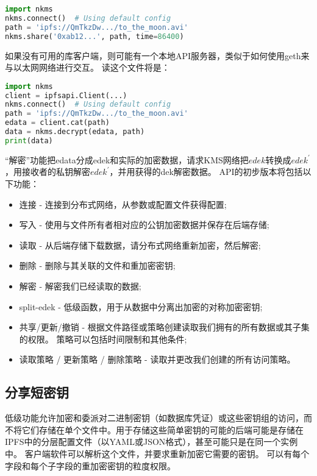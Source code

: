 \documentclass[longbibliography,nofootinbib]{revtex4-1}
\begin{document}
\begin{CJK*}{UTF8}{gbsn}
\begin{lstlisting}[frame=single,language=Python]
import nkms
nkms.connect()  # Using default config
path = 'ipfs://QmTkzDw.../to_the_moon.avi'
nkms.share('0xab12...', path, time=86400)
\end{lstlisting}

如果没有可用的库客户端，则可能有一个本地API服务器，类似于如何使用geth来与以太网网络进行交互。 读这个文件将是：

\begin{lstlisting}[frame=single,language=Python]
import nkms
client = ipfsapi.Client(...)
nkms.connect()  # Using default config
path = 'ipfs://QmTkzDw.../to_the_moon.avi'
edata = client.cat(path)
data = nkms.decrypt(edata, path)
print(data)
\end{lstlisting}

“解密”功能把edata分成edek和实际的加密数据，请求KMS网络把$edek$转换成$edek^{\prime}$，用接收者的私钥解密$edek^{\prime}$，并用获得的dek解密数据。
  API的初步版本将包括以下功能：

\begin{itemize}
    \item 连接 - 连接到分布式网络，从参数或配置文件获得配置;
    \item 写入 - 使用与文件所有者相对应的公钥加密数据并保存在后端存储;
    \item 读取 - 从后端存储下载数据，请分布式网络重新加密，然后解密;
    \item 删除 - 删除与其关联的文件和重加密密钥;
    \item 解密 - 解密我们已经读取的数据;
    \item split-edek - 低级函数，用于从数据中分离出加密的对称加密密钥;
    \item 共享/更新/撤销 - 根据文件路径或策略创建读取我们拥有的所有数据或其子集的权限。 策略可以包括时间限制和其他条件;
    \item 读取策略 / 更新策略 / 删除策略 - 读取并更改我们创建的所有访问策略。
\end{itemize}

\subsection{分享短密钥}

低级功能允许加密和委派对二进制密钥（如数据库凭证）或这些密钥组的访问，而不将它们存储在单个文件中。用于存储这些简单密钥的可能的后端可能是存储在IPFS中的分层配置文件（以YAML或JSON格式），甚至可能只是在同一个实例中。 客户端软件可以解析这个文件，并要求重新加密它需要的密钥。 可以有每个字段和每个子字段的重加密密钥的粒度权限。


\end{CJK*}
\end{document}
